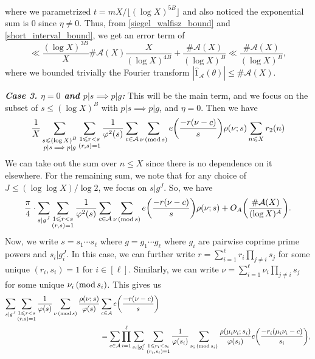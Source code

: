 \documentclass[12pt]{amsart}
\theoremstyle{definition}
\theoremstyle{definition}
\theoremstyle{remark}
\numberwithin{equation}{section}
\newcommand{\CA}{\mathcal{A}}
\renewcommand{\leq}{\leqslant}
\renewcommand{\hat}{\widehat}
\renewcommand{\mod}[1]{\,({\rm mod}\,#1)}
\begin{document}
where we parametrized $t=m X/\lfloor (\log X)^{5B}\rfloor$ and also noticed the exponential sum is $0$ since $\eta\not=0$. Thus, from \eqref{siegel_walfisz_bound} and \eqref{short_interval_bound}, we get an error term of
\begin{equation}\label{major_arc_error_case_2}
\ll \frac{(\log X)^{3B}}{X} \#\CA(X) \frac{X}{(\log X)^{4B}} +  \frac{\#\CA(X)}{(\log X)^B} \ll \frac{\#\CA(X)}{(\log X)^{B}}, 
\end{equation}
where we bounded trivially the Fourier transform $|\hat{1}_{\CA}(\theta) | \leq \#\CA(X)$.


\noindent \textit{\textbf{Case 3. $\eta=0$ and $p|s\implies p|g$:}}
This will be the main term, and we focus on the subset of $s\leq (\log X)^B$ with $p|s \implies p|g$, and $\eta=0$. Then we have
\begin{gather*}
\frac{1}{X} \sum_{\substack{s\leq (\log X)^B \\ p|s\implies p|g}} \sum_{\substack{1\leq r < s \\ (r,s)=1}} \frac{1}{\varphi^2(s)} \sum_{c\in \CA} \sum_{\nu \mod s} e\bigg(\frac{-r(\nu-c)}{s} \bigg) \rho(\nu; s) \sum_{n\leq X} r_2(n)
\end{gather*}
We can take out the sum over $n\leq X$ since there is no dependence on it elsewhere. For the remaining sum, we note that for any choice of $J \leq (\log\log X)/\log 2$, we focus on $s|g^J$. So, we have
\begin{gather*}
\frac{\pi}{4} \cdot  \sum_{\substack{s|g^J }} \sum_{\substack{1\leq r < s \\ (r,s)=1}} \frac{1}{\varphi^2(s)} \sum_{c\in \CA} \sum_{\nu \mod s} e\bigg(\frac{-r(\nu-c)}{s} \bigg) \rho(\nu; s) + O_A\bigg( \frac{\#\CA(X)}{(\log X)^A} \bigg).
\end{gather*}
Now, we write $s=s_1\cdots s_{\ell}$ where $g=g_1\cdots g_{\ell}$ where $g_i$ are pairwise coprime prime powers and $s_i | g_i^J$. In this case, we can further write $r=\sum_{i=1}^{\ell}r_i \prod_{j\not=i} s_j$ for some unique $(r_i,s_i)=1$ for $i\in [\ell]$. Similarly, we can write $\nu=\sum_{i=1}^{\ell} \nu_i \prod_{j\not= i} s_j$ for some unique $\nu_i \mod{s_i}$. This gives us
\begin{align*}
\sum_{\substack{s| g^J}}\sum_{\substack{1\leq r < s \\ (r,s)=1}} \frac{1}{\varphi(s)} \sum_{\nu \mod s} \frac{\rho(\nu; s)}{\varphi(s)} &\sum_{c\in \CA}e\bigg(\frac{-r(\nu-c)}{s} \bigg)  \\ 
&= \sum_{c\in \CA} \prod_{i=1}^{\ell}\sum_{\substack{s_i| g_i^J}} \sum_{\substack{1\leq r_i < s_i \\ (r_i,s_i)=1}} \frac{1}{\varphi(s_i)} \sum_{\nu_i \mod{s_i}} \frac{\rho(\mu_i\nu_i; s_i)}{\varphi(s_i)} e\bigg(\frac{-r_i(\mu_i\nu_i-c)}{s_i} \bigg),
\end{align*}
\end{document}
